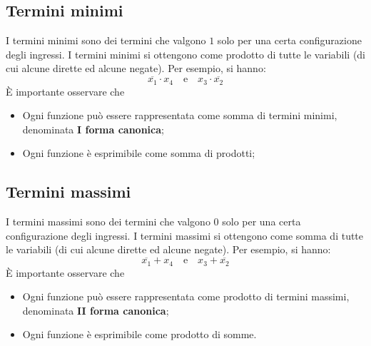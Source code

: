 \documentclass[a4paper]{extarticle}
\begin{document}
\begin{figure}[H]
\end{figure}

\vspace{1em}
\noindent
\subsection{Termini minimi}
I termini minimi sono dei termini che valgono $1$ solo per una certa configurazione degli ingressi. I termini minimi si ottengono come prodotto di tutte le variabili (di cui alcune dirette ed alcune negate). Per esempio, si hanno:
\[\overline{x_1} \cdot x_4 \hspace{1em} \text{e} \hspace{1em} x_3 \cdot \overline{x_2}\]
È importante osservare che
\begin{itemize}
    \item Ogni funzione può essere rappresentata come somma di termini minimi, denominata \textbf{I forma canonica};
    \item Ogni funzione è esprimibile come somma di prodotti;
\end{itemize}

\vspace{1em}
\noindent
\subsection{Termini massimi}
I termini massimi sono dei termini che valgono $0$ solo per una certa configurazione degli ingressi. I termini massimi si ottengono come somma di tutte le variabili (di cui alcune dirette ed alcune negate). Per esempio, si hanno:
\[\overline{x_1} + x_4 \hspace{1em} \text{e} \hspace{1em} x_3 + \overline{x_2}\]
È importante osservare che
\begin{itemize}
    \item Ogni funzione può essere rappresentata come prodotto di termini massimi, denominata \textbf{II forma canonica};
    \item Ogni funzione è esprimibile come prodotto di somme.
\end{itemize}
\end{document}
